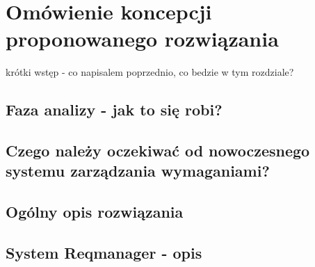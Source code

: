 \chapter{Omówienie koncepcji proponowanego rozwiązania}
  
  krótki wstęp - co napisalem poprzednio, co bedzie w tym rozdziale?
  
  \section{Faza analizy - jak to się robi?}
  \section{Czego należy oczekiwać od nowoczesnego systemu zarządzania wymaganiami?}
  \section{Ogólny opis rozwiązania}
  \section{System Reqmanager - opis}
